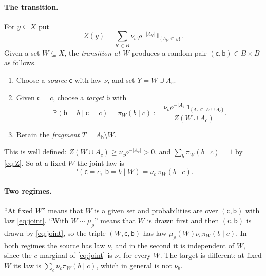 \documentclass[11pt]{article}
\numberwithin{equation}{section}
\newcommand{\PP}{\mathbb P}
\newcommand{\ind}{\mathbf 1}
\newcommand{\src}{\mathsf c}
\newcommand{\tgt}{\mathsf b}
\begin{document}
\paragraph{The transition.}
For $y\subseteq X$ put
\begin{equation}\label{eq:Z}
 Z(y)=\sum_{b'\in B}\nu_{b'}\rho^{-|A_{b'}|}
                  \ind_{\{A_{b'}\subseteq y\}}.
\end{equation}
Given a set $W\subseteq X$, the \emph{transition at $W$} produces a
random pair $(\src,\tgt)\in B\times B$ as follows.
\begin{enumerate}[label=\arabic*.,leftmargin=2em,itemsep=2pt]
 \item Choose a \emph{source} $\src$ with law $\nu$, and set
 $Y=W\cup A_{\src}$.
 \item Given $\src=c$, choose a \emph{target} $\tgt$ with
 \begin{equation}\label{eq:posterior}
  \PP(\tgt=b\mid\src=c)=\pi_W(b\mid c):=
  \frac{\nu_b\rho^{-|A_b|}\ind_{\{A_b\subseteq W\cup A_c\}}}
       {Z(W\cup A_c)}.
 \end{equation}
 \item Retain the \emph{fragment} $T=A_{\tgt}\setminus W$.
\end{enumerate}
This is well defined: $Z(W\cup A_c)\ge\nu_c\rho^{-|A_c|}>0$, and
$\sum_b\pi_W(b\mid c)=1$ by \eqref{eq:Z}. So at a fixed $W$ the joint
law is
\begin{equation}\label{eq:joint}
 \PP(\src=c,\ \tgt=b\mid W)=\nu_c\,\pi_W(b\mid c).
\end{equation}

\paragraph{Two regimes.}
``At fixed $W$'' means that $W$ is a given set and probabilities are
over $(\src,\tgt)$ with law \eqref{eq:joint}. ``With $W\sim\mu_\rho$''
means that $W$ is drawn first and then $(\src,\tgt)$ is drawn by
\eqref{eq:joint}, so the triple $(W,\src,\tgt)$ has law
$\mu_\rho(W)\nu_c\pi_W(b\mid c)$. In both regimes the source has law
$\nu$, and in the second it is independent of $W$, since the
$c$-marginal of \eqref{eq:joint} is $\nu_c$ for every $W$. The target
is different: at fixed $W$ its law is $\sum_c\nu_c\pi_W(b\mid c)$,
which in general is not $\nu_b$.
\end{document}
